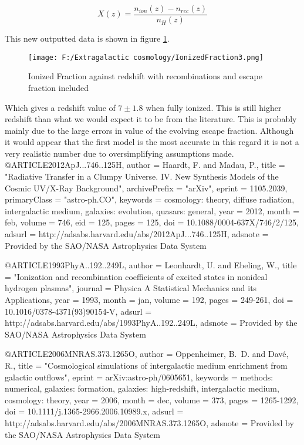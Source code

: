 \begin{equation}
X(z)=\frac{n_{ion}(z)-n_{rec}(z)}{n_{H}(z)}
\end{equation}

This new outputted data is shown in figure \ref{fig:IonizedFraction3}.\\

\begin{figure}
	\centering
		\texttt{[image: F:/Extragalactic cosmology/IonizedFraction3.png]}
	\caption{Ionized Fraction against redshift with recombinations and escape fraction included}
	\label{fig:IonizedFraction3}
\end{figure}

Which gives a redshift value of $7\pm1.8$ when fully ionized. This is still higher redshift than what we would expect it to be from the literature. This is probably mainly due to the large errors in value of the evolving escape fraction. Although it would appear that the first model is the most accurate in this regard it is not a very realistic number due to oversimplifying assumptions made.\\ 


@ARTICLE{2012ApJ...746..125H,
   author = {{Haardt}, F. and {Madau}, P.},
    title = "{Radiative Transfer in a Clumpy Universe. IV. New Synthesis Models of the Cosmic UV/X-Ray Background}",
archivePrefix = "arXiv",
   eprint = {1105.2039},
 primaryClass = "astro-ph.CO",
 keywords = {cosmology: theory, diffuse radiation, intergalactic medium, galaxies: evolution, quasars: general},
     year = 2012,
    month = feb,
   volume = 746,
      eid = {125},
    pages = {125},
      doi = {10.1088/0004-637X/746/2/125},
   adsurl = {http://adsabs.harvard.edu/abs/2012ApJ...746..125H},
  adsnote = {Provided by the SAO/NASA Astrophysics Data System}
}

@ARTICLE{1993PhyA..192..249L,
   author = {{Leonhardt}, U. and {Ebeling}, W.},
    title = "{Ionization and recombination coefficients of excited states in nonideal hydrogen plasmas}",
  journal = {Physica A Statistical Mechanics and its Applications},
     year = 1993,
    month = jan,
   volume = 192,
    pages = {249-261},
      doi = {10.1016/0378-4371(93)90154-V},
   adsurl = {http://adsabs.harvard.edu/abs/1993PhyA..192..249L},
  adsnote = {Provided by the SAO/NASA Astrophysics Data System}
}

@ARTICLE{2006MNRAS.373.1265O,
   author = {{Oppenheimer}, B.~D. and {Dav{\'e}}, R.},
    title = "{Cosmological simulations of intergalactic medium enrichment from galactic outflows}",
   eprint = {arXiv:astro-ph/0605651},
 keywords = {methods: numerical, galaxies: formation, galaxies: high-redshift, intergalactic medium, cosmology: theory},
     year = 2006,
    month = dec,
   volume = 373,
    pages = {1265-1292},
      doi = {10.1111/j.1365-2966.2006.10989.x},
   adsurl = {http://adsabs.harvard.edu/abs/2006MNRAS.373.1265O},
  adsnote = {Provided by the SAO/NASA Astrophysics Data System}
}